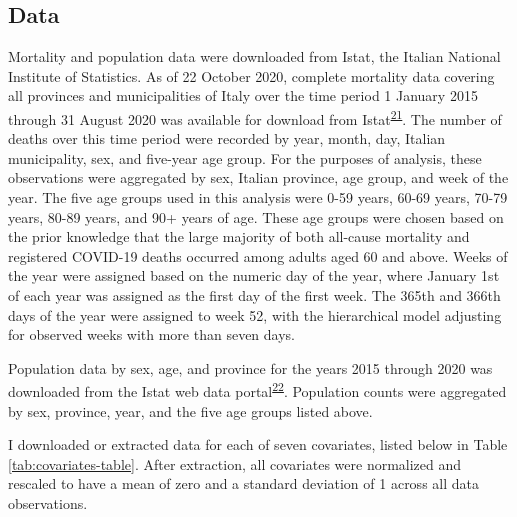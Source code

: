 \documentclass[
]{article}
\begin{document}
\hypertarget{data}{%
\subsection{Data}\label{data}}

Mortality and population data were downloaded from Istat, the Italian National Institute of Statistics. As of 22 October 2020, complete mortality data covering all provinces and municipalities of Italy over the time period 1 January 2015 through 31 August 2020 was available for download from Istat\textsuperscript{\protect\hyperlink{ref-ItalianNationalInstituteofStatisticsIstat2020a}{21}}⁠. The number of deaths over this time period were recorded by year, month, day, Italian municipality, sex, and five-year age group. For the purposes of analysis, these observations were aggregated by sex, Italian province, age group, and week of the year. The five age groups used in this analysis were 0-59 years, 60-69 years, 70-79 years, 80-89 years, and 90+ years of age. These age groups were chosen based on the prior knowledge that the large majority of both all-cause mortality and registered COVID-19 deaths occurred among adults aged 60 and above. Weeks of the year were assigned based on the numeric day of the year, where January 1st of each year was assigned as the first day of the first week. The 365th and 366th days of the year were assigned to week 52, with the hierarchical model adjusting for observed weeks with more than seven days.

Population data by sex, age, and province for the years 2015 through 2020 was downloaded from the Istat web data portal\textsuperscript{\protect\hyperlink{ref-ItalianNationalInstituteofStatisticsIstat2020}{22}}⁠. Population counts were aggregated by sex, province, year, and the five age groups listed above.

I downloaded or extracted data for each of seven covariates, listed below in Table \ref{tab:covariates-table}. After extraction, all covariates were normalized and rescaled to have a mean of zero and a standard deviation of 1 across all data observations.
\end{document}
